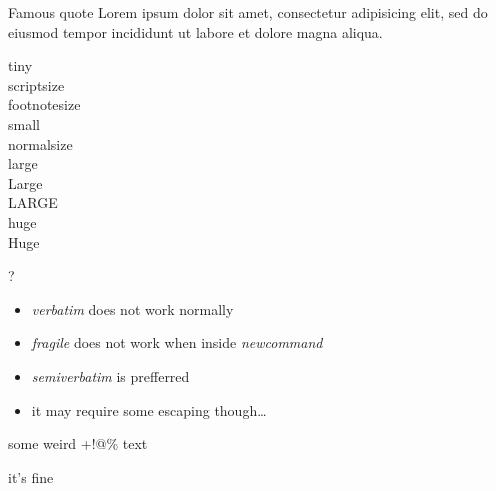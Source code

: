 {
\begin{block}{Famous quote}
Lorem ipsum dolor sit amet, consectetur adipisicing elit, sed do eiusmod tempor incididunt ut labore et dolore magna aliqua.
\end{block}
}


{
\tiny{tiny} \\
\scriptsize{scriptsize} \\
\footnotesize{footnotesize} \\
\small{small} \\
\normalsize{normalsize} \\
\large{large} \\
\Large{Large} \\
\LARGE{LARGE} \\
\huge{huge} \\
\Huge{Huge}
}


{
\begin{center}
\vspace{-10em}
\fontsize{160}{200}\selectfont ?
\end{center}
}


{
\begin{itemize}
\item \emph{verbatim} does not work normally
\item \emph{fragile} does not work when inside \emph{newcommand}
\item \emph{semiverbatim} is prefferred
\item it may require some escaping though\ldots
\end{itemize}
\begin{semiverbatim}
some weird +!@\% text

it's fine \
\end{semiverbatim}
}



